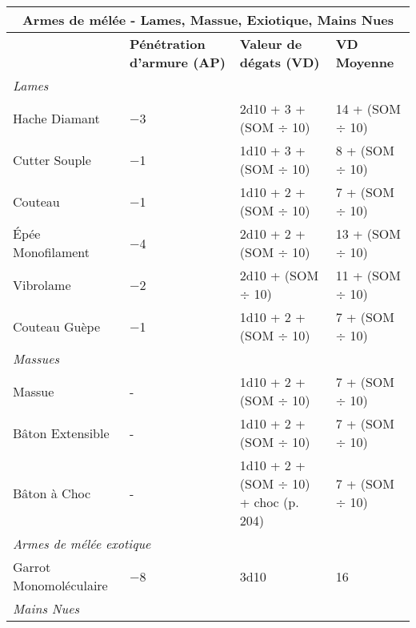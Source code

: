 \begin{table} \begin{tabularx}{\textwidth}{|l|X|l|l|} \hline

\multicolumn{4}{|c|}{\textbf{Armes de mélée - Lames, Massue, Exiotique, Mains Nues}} \\ \hline

&\textbf{Pénétration d'armure (AP)}	&\textbf{Valeur de dégats (VD)}	&\textbf{VD Moyenne} \\ \hline

\multicolumn{4}{|l|}{\emph{Lames}} \\ \hline

Hache Diamant	&$-$3	&2d10 + 3 + (SOM $\div$ 10)	&14 + (SOM $\div$ 10) \\ \hline

Cutter Souple	&$-$1	&1d10 + 3 + (SOM $\div$ 10)	&8 + (SOM $\div$ 10) \\ \hline

Couteau	&$-$1	&1d10 + 2 + (SOM $\div$ 10)	&7 + (SOM $\div$ 10) \\ \hline

Épée Monofilament	&$-$4	&2d10 + 2 + (SOM $\div$ 10)	&13 + (SOM $\div$ 10) \\ \hline

Vibrolame	&$-$2	&2d10 + (SOM $\div$ 10)	&11 + (SOM $\div$ 10) \\ \hline

Couteau Guèpe	&$-$1	&1d10 + 2 + (SOM $\div$ 10)	&7 + (SOM $\div$ 10) \\ \hline

\multicolumn{4}{|l|}{\emph{Massues}} \\ \hline

Massue	&- &1d10 + 2 + (SOM $\div$ 10)	&7 + (SOM $\div$ 10) \\ \hline

Bâton Extensible	&- &1d10 + 2 + (SOM $\div$ 10)	&7 + (SOM $\div$ 10) \\ \hline

Bâton à Choc	&- &1d10 + 2 + (SOM $\div$ 10) + choc (p. 204)	&7 + (SOM $\div$ 10) \\ \hline

\multicolumn{4}{|l|}{\emph{Armes de mélée exotique}} \\ \hline

Garrot Monomoléculaire	&$-$8	&3d10	&16 \\ \hline

\multicolumn{4}{|l|}{\emph{Mains Nues}} \\ \hline


\end{tabularx}
\end{table}

